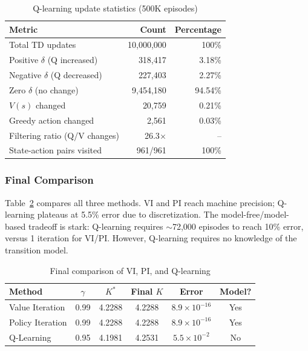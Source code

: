 \begin{table}[h!]
\centering
\caption{Q-learning update statistics (500K episodes)}
\label{tab:qlearning_analysis}
\begin{tabular}{l|r|r}
\hline
Metric & Count & Percentage \\
\hline
Total TD updates & 10,000,000 & 100\% \\
Positive $\delta$ (Q increased) & 318,417 & 3.18\% \\
Negative $\delta$ (Q decreased) & 227,403 & 2.27\% \\
Zero $\delta$ (no change) & 9,454,180 & 94.54\% \\
\hline
$V(s)$ changed & 20,759 & 0.21\% \\
Greedy action changed & 2,561 & 0.03\% \\
Filtering ratio (Q/V changes) & 26.3$\times$ & -- \\
\hline
State-action pairs visited & 961/961 & 100\% \\
\hline
\end{tabular}
\end{table}

\subsubsection{Final Comparison}

Table~\ref{tab:final_comparison} compares all three methods. VI and PI reach machine precision; Q-learning plateaus at 5.5\% error due to discretization. The model-free/model-based tradeoff is stark: Q-learning requires $\sim$72,000 episodes to reach 10\% error, versus 1 iteration for VI/PI. However, Q-learning requires no knowledge of the transition model.

\begin{table}[h!]
\centering
\caption{Final comparison of VI, PI, and Q-learning}
\label{tab:final_comparison}
\begin{tabular}{l|c|c|c|c|c}
\hline
Method & $\gamma$ & $K^*$ & Final $K$ & Error & Model? \\
\hline
Value Iteration & 0.99 & 4.2288 & 4.2288 & $8.9 \times 10^{-16}$ & Yes \\
Policy Iteration & 0.99 & 4.2288 & 4.2288 & $8.9 \times 10^{-16}$ & Yes \\
Q-Learning & 0.95 & 4.1981 & 4.2531 & $5.5 \times 10^{-2}$ & No \\
\hline
\end{tabular}
\end{table}

